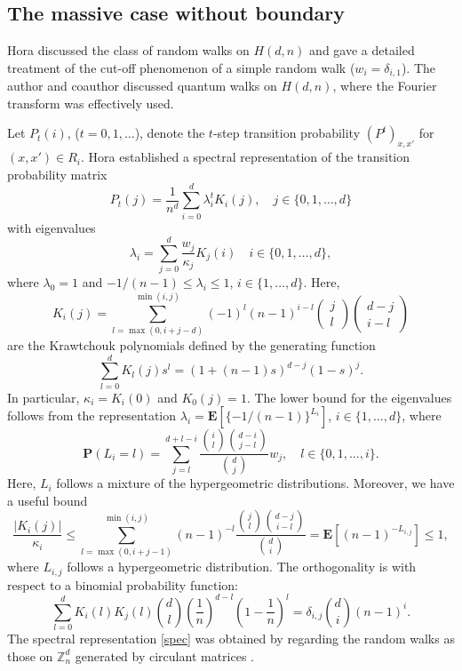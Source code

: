 \documentclass[a4paper,11pt]{article}
\theoremstyle{plain}
\theoremstyle{definition}
\begin{document}
\subsection{The massive case without boundary}

Hora \cite{Hor97} discussed the class of random walks
on $H(d,n)$ and gave a detailed treatment of the cut-off
phenomenon of a simple random walk ($w_i=\delta_{i,1}$).
The author and coauthor \cite{GM25a} discussed quantum
walks on $H(d,n)$, where the Fourier transform was
effectively used.

Let $P_t(i)$, ($t=0,1,\ldots$), denote the $t$-step
transition probability $(P^t)_{x,x'}$ for $(x,x')\in R_i$.
Hora \cite{Hor97} established a spectral representation
of the transition probability matrix
\begin{equation}\label{spec}
  P_t(j)=\frac{1}{n^d}\sum_{i=0}^d\lambda_i^t K_i(j),
  \quad j\in\{0,1,\ldots,d\}
\end{equation}
with eigenvalues
\begin{equation}\label{eigen} 
  \lambda_i=\sum_{j=0}^d \frac{w_j}{\kappa_j} K_j(i)
  \quad i\in\{0,1,\ldots,d\},
\end{equation}
where $\lambda_0=1$ and $-1/(n-1)\le \lambda_i\le 1$,
$i\in\{1,\ldots,d\}$. Here, 
\begin{equation}\label{Kpol}
  K_i(j)=\sum_{l=\max(0,i+j-d)}^{\min(i,j)}(-1)^l(n-1)^{i-l}
  \begin{pmatrix}j\\l\end{pmatrix}
  \begin{pmatrix}d-j\\i-l\end{pmatrix}
\end{equation}
are the Krawtchouk polynomials defined by the generating
function \cite[Section~2.10]{BBIT21}
\begin{equation}\label{gen}
  \sum_{l=0}^dK_l(j)s^l=(1+(n-1)s)^{d-j}(1-s)^j.
\end{equation}
In particular, $\kappa_i=K_i(0)$ and $K_0(j)=1$.
The lower bound for the eigenvalues follows from the
representation $\lambda_i=\mathbf{E}[\{-1/(n-1)\}^{L_i}]$,
$i\in\{1,\ldots,d\}$, where
\[
  \mathbf{P}(L_i=l)=\sum_{j=l}^{d+l-i}
  \frac{\binom{i}{l}\binom{d-i}{j-l}}{\binom{d}{j}}w_j,
  \quad l\in\{0,1,\ldots,i\}.
\]  
Here, $L_i$ follows a mixture of the hypergeometric
distributions.
Moreover, we have a useful bound
\begin{equation}\label{Kbound}
  \frac{|K_i(j)|}{\kappa_i}\le
  \sum_{l=\max(0,i+j-1)}^{\min(i,j)}(n-1)^{-l}
  \frac{\binom{j}{l}\binom{d-j}{i-l}}{\binom{d}{i}}
  =\mathbf{E}[(n-1)^{-{L_{i,j}}}]\le 1,
\end{equation}
where $L_{i,j}$ follows a hypergeometric distribution.
The orthogonality is with respect to
a binomial probability function:
\[
  \sum_{l=0}^dK_i(l)K_j(l)\binom{d}{l}
  \left(\frac{1}{n}\right)^{d-l}\left(1-\frac{1}{n}\right)^l
  =\delta_{i,j}\binom{d}{i}(n-1)^i.
\]
The spectral representation \eqref{spec} was obtained
by regarding the random walks as those on $\mathbb{Z}^d_n$
generated by circulant matrices \cite[Remark 27]{GM25b}.
\end{document}
